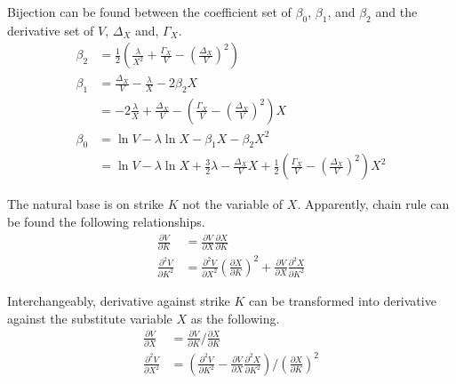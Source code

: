 \documentclass{article}
\begin{document}
Bijection can be found between the coefficient set of $ \beta_0 $, $ \beta_1 $, and $ \beta_2 $ and the derivative set of $ V $, $ \Delta_X $ and, $ \Gamma_X $.
\begin{subequations}
    \begin{align}
        \beta_2 &= \frac{1}{2} \left(\frac{\lambda}{X^2} + \frac{\Gamma_X}{V} - \left(\frac{\Delta_X}{V}\right)^2\right) \\
        \beta_1 &= \frac{\Delta_X}{V} - \frac{\lambda}{X} - 2 \beta_2 X \nonumber \\
        &= - 2 \frac{\lambda}{X} + \frac{\Delta_X}{V} - \left(\frac{\Gamma_X}{V} - \left(\frac{\Delta_X}{V}\right)^2\right) X \\
        \beta_0 &= \ln{V} - \lambda \ln{X} - \beta_1 X - \beta_2 X^2 \nonumber \\
        &= \ln{V} - \lambda \ln{X} + \frac{3}{2} \lambda - \frac{\Delta_X}{V} X + \frac{1}{2} \left(\frac{\Gamma_X}{V} - \left(\frac{\Delta_X}{V}\right)^2\right) X^2
    \end{align}
\end{subequations}

The natural base is on strike $ K $ not the variable of $ X $.
Apparently, chain rule can be found the following relationships.
\begin{subequations}
    \begin{align}
        \frac{\partial V}{\partial K} &= \frac{\partial V}{\partial X} \frac{\partial X}{\partial K} \\
        \frac{\partial^2 V}{\partial K^2} &= \frac{\partial^2 V}{\partial X^2} \left(\frac{\partial X}{\partial K}\right)^2 + \frac{\partial V}{\partial X} \frac{\partial^2 X}{\partial K^2}
    \end{align}
\end{subequations}

Interchangeably, derivative against strike $ K $ can be transformed into derivative against the substitute variable $ X $ as the following.
\begin{subequations}
    \begin{align}
        \frac{\partial V}{\partial X} &= \frac{\partial V}{\partial K} \bigg/ \frac{\partial X}{\partial K} \\
        \frac{\partial^2 V}{\partial X^2} &= \left(\frac{\partial^2 V}{\partial K^2} - \frac{\partial V}{\partial X} \frac{\partial^2 X}{\partial K^2}\right) \bigg/ \left(\frac{\partial X}{\partial K}\right)^2
    \end{align}
\end{subequations}
\end{document}
